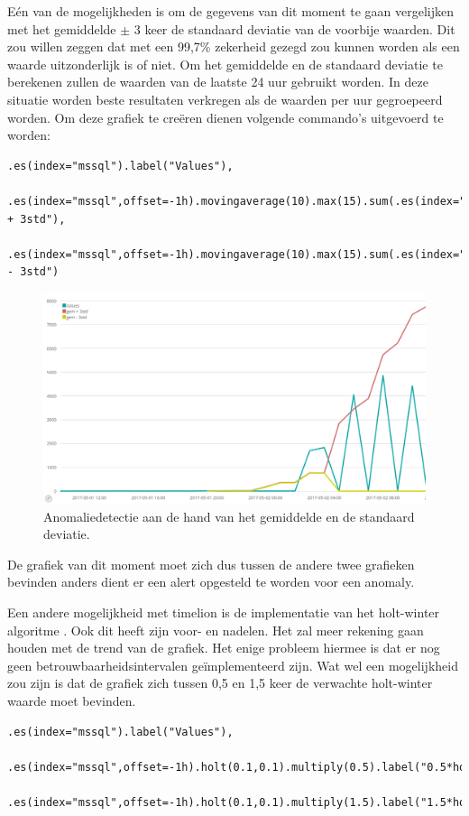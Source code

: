 Eén van de mogelijkheden is om de gegevens van dit moment te gaan vergelijken met het gemiddelde $\pm$ 3 keer de standaard deviatie van de voorbije waarden.
Dit zou willen zeggen dat met een 99,7\% zekerheid gezegd zou kunnen worden als een waarde uitzonderlijk is of niet. Om het gemiddelde en de standaard deviatie te berekenen zullen de waarden van de laatste 24 uur gebruikt worden. 
In deze situatie worden beste resultaten verkregen als de waarden per uur gegroepeerd worden. Om deze grafiek te creëren dienen volgende commando's uitgevoerd te worden:
\lstset{escapechar=@,style=customc}        
\begin{lstlisting}[frame=single]  
	.es(index="mssql").label("Values"),
	.es(index="mssql",offset=-1h).movingaverage(10).max(15).sum(.es(index="mssql",offset=-1h).movingstd(10).multiply(3)).label("gem + 3std"),
	.es(index="mssql",offset=-1h).movingaverage(10).max(15).sum(.es(index="mssql",offset=-1h).movingstd(10).multiply(-3)).label("gem - 3std")
\end{lstlisting}

\begin{figure}[h]
	\includegraphics[width=16cm]{img/avg3std}
	\caption{Anomaliedetectie aan de hand van het gemiddelde en de standaard deviatie.}
	\label{fig:avg3std}
\end{figure}

De grafiek van dit moment moet zich dus tussen de andere twee grafieken bevinden anders dient er een alert opgesteld te worden voor een anomaly.


Een andere mogelijkheid met timelion is de implementatie van het holt-winter algoritme \autocite{holtwinters}.
Ook dit heeft zijn voor- en nadelen. Het zal meer rekening gaan houden met de trend van de grafiek. Het enige probleem hiermee is dat er nog geen betrouwbaarheidsintervalen geïmplementeerd zijn.
Wat wel een mogelijkheid zou zijn is dat de grafiek zich tussen 0,5 en 1,5 keer de verwachte holt-winter waarde moet bevinden.
\lstset{escapechar=@,style=customc}        
\begin{lstlisting}[frame=single]  
	.es(index="mssql").label("Values"),
	.es(index="mssql",offset=-1h).holt(0.1,0.1).multiply(0.5).label("0.5*holt"),
	.es(index="mssql",offset=-1h).holt(0.1,0.1).multiply(1.5).label("1.5*holt")
\end{lstlisting}

